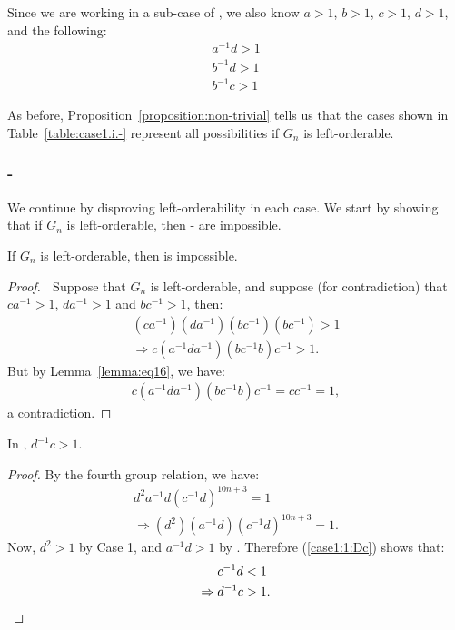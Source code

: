 \noindent{}Since we are working in a sub-case of , we also know $a>1$, $b>1$, $c>1$, $d>1$, and the following:
\begin{align} a^{-1}d>1\label{case1.i:inEq:Ad}\\
b^{-1}d>1\label{case1.i:inEq:Bd}\\
b^{-1}c>1
\end{align}

\noindent{}As before, Proposition~\ref{proposition:non-trivial} tells us that the cases shown in Table~\ref{table:case1.i.-} represent all possibilities if $G_n$ is left-orderable.

\subsubsection{-}
\noindent{}We continue by disproving left-orderability in each case. We start by showing that if $G_n$ is left-orderable, then - are impossible.

\begin{proposition} If $G_n$ is left-orderable, then  is impossible.
\end{proposition}
\begin{proof} $\;$ Suppose that $G_n$ is left-orderable, and suppose (for contradiction) that $ca^{-1}>1$, $da^{-1}>1$ and $bc^{-1}>1$, then: 
\begin{align*}
(ca^{-1})(da^{-1})(bc^{-1})(bc^{-1})>1\\
\Rightarrow{}c(a^{-1}da^{-1})(bc^{-1}b)c^{-1}>1.
\end{align*}
But by Lemma~\ref{lemma:eq16}, we have:
\begin{align*}
c(a^{-1}da^{-1})(bc^{-1}b)c^{-1}=cc^{-1}=1,
\end{align*}
a contradiction.
\end{proof}

\begin{lemma} In , $d^{-1}c>1$.\label{case1.1:Dc}
\end{lemma}
\begin{proof} By the fourth group relation, we have:
\begin{align}
d^{2}a^{-1}d(c^{-1}d)^{10n+3}=1\nonumber{}\\
\Rightarrow{}(d^{2})(a^{-1}d)(c^{-1}d)^{10n+3}=1.\label{case1:1:Dc}
\end{align}
Now, $d^{2}>1$ by Case 1, and $a^{-1}d>1$ by . Therefore (\ref{case1:1:Dc}) shows that:
\begin{align*}
c^{-1}d&<1\\
\Rightarrow{}d^{-1}c&>1.\qedhere
\end{align*}
\end{proof}

